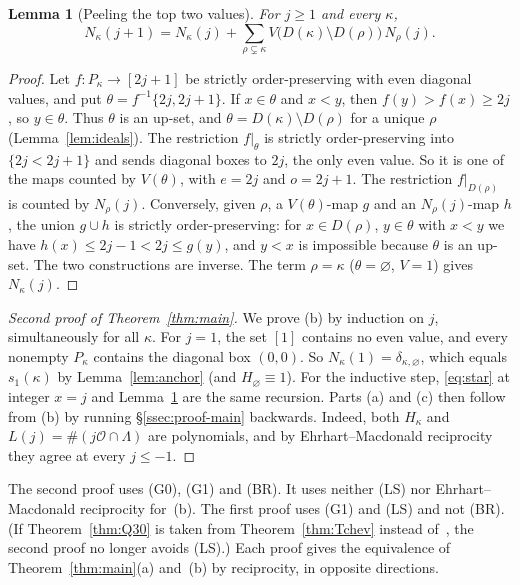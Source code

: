 \documentclass[11pt]{amsart}
\newtheorem{lemma}[theorem]{Lemma}
\theoremstyle{definition}
\theoremstyle{remark}
\newcommand{\ord}{\mathcal{O}}
\begin{document}
\begin{lemma}[Peeling the top two values]\label{lem:peel}
For $j\ge1$ and every $\kappa$,
\[ N_\kappa(j+1)=N_\kappa(j)+\sum_{\rho\subsetneq\kappa}V\bigl(D(\kappa)\setminus D(\rho)\bigr)\,N_\rho(j). \]
\end{lemma}

\begin{proof}
Let $f\colon P_\kappa\to[2j+1]$ be strictly order-preserving with even diagonal values, and put
$\theta=f^{-1}\{2j,2j+1\}$. If $x\in\theta$ and $x<y$, then $f(y)>f(x)\ge2j$, so $y\in\theta$.
Thus $\theta$ is an up-set, and $\theta=D(\kappa)\setminus D(\rho)$ for a unique $\rho$
(Lemma~\ref{lem:ideals}). The restriction $f|_\theta$ is strictly order-preserving into
$\{2j<2j+1\}$ and sends diagonal boxes to $2j$, the only even value. So it is one of the maps
counted by $V(\theta)$, with $e=2j$ and $o=2j+1$. The restriction $f|_{D(\rho)}$ is counted by
$N_\rho(j)$. Conversely, given $\rho$, a $V(\theta)$-map $g$ and an $N_\rho(j)$-map $h$, the
union $g\cup h$ is strictly order-preserving: for $x\in D(\rho)$, $y\in\theta$ with $x<y$ we
have $h(x)\le2j-1<2j\le g(y)$, and $y<x$ is impossible because $\theta$ is an up-set. The two
constructions are inverse. The term $\rho=\kappa$ ($\theta=\varnothing$, $V=1$) gives
$N_\kappa(j)$.
\end{proof}

\begin{proof}[Second proof of Theorem~\ref{thm:main}]
We prove (b) by induction on $j$, simultaneously for all $\kappa$. For $j=1$, the set $[1]$
contains no even value, and every nonempty $P_\kappa$ contains the diagonal box $(0,0)$. So
$N_\kappa(1)=\delta_{\kappa,\varnothing}$, which equals $s_1(\kappa)$ by
Lemma~\ref{lem:anchor} (and $H_\varnothing\equiv1$). For the inductive step,
\eqref{eq:star} at integer $x=j$ and Lemma~\ref{lem:peel} are the same recursion. Parts (a)
and (c) then follow from (b) by running \S\ref{ssec:proof-main} backwards. Indeed, both
$H_\kappa$ and $L(j)=\#(j\ord\cap\Lambda)$ are polynomials, and by Ehrhart--Macdonald
reciprocity they agree at every $j\le-1$.
\end{proof}

The second proof uses (G0), (G1) and (BR). It uses neither (LS) nor Ehrhart--Macdonald
reciprocity for~(b). The first proof uses (G1) and (LS) and not (BR). (If Theorem~\ref{thm:Q30}
is taken from Theorem~\ref{thm:Tchev} instead of~\cite{BR12}, the second proof no longer
avoids (LS).) Each proof gives the
equivalence of Theorem~\ref{thm:main}(a) and~(b) by reciprocity, in opposite directions.
\end{document}

